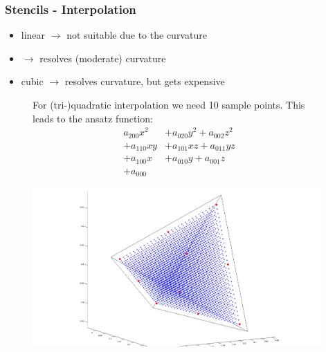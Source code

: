 \documentclass[t,compress=false,usepdftitle=false]{beamer}
\begin{document}
%
%
\begin{frame}\frametitle{Stencils - Interpolation }

\begin{itemize}
\item{linear    $\rightarrow$ not suitable due to the curvature}
\item{ $\rightarrow$ resolves (moderate) curvature}
\item{cubic     $\rightarrow$ resolves curvature, but gets expensive}
\end{itemize}

\begin{figure}[htbp]
  \begin{minipage}{0.48\textwidth}   
For (tri-)quadratic interpolation we need 10 sample points.
This leads to the ansatz function:  
\begin{align*}
\label{eq:quadraticPolynomial}
a_{200}x^2 &+ a_{020}y^2 + a_{002}z^2 \\
+ a_{110}xy &+ a_{101}xz + a_{011}yz \\
+ a_{100}x &+ a_{010}y + a_{001}z \\
+ a_{000}
\end{align*}

  \end{minipage}
  \hfill
  \begin{minipage}{0.48\textwidth}
\includegraphics[width=0.98\textwidth]{tetSamplePointsPNG.png}
  \end{minipage}
\end{figure}


\end{frame}
\end{document}
